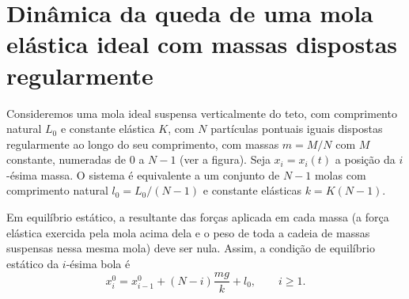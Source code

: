 \documentclass{article}
\begin{document}
\section{Dinâmica da queda de uma mola elástica ideal com massas dispostas
regularmente}
\noindent
\begin{minipage}[t]{0.80\linewidth}
  \hspace{1.2em}
  Consideremos uma mola ideal suspensa verticalmente do teto, com comprimento
  natural $L_0$ e constante elástica $K$, com $N$ partículas pontuais iguais
  dispostas regularmente ao longo do seu comprimento, com massas $m=M/N$ com $M$
  constante, numeradas de 0 a $N-1$ (ver a figura). Seja $x_i=x_i(t)$ a posição
  da $i$-ésima massa. O sistema é equivalente a um conjunto de $N-1$ molas com
  comprimento natural $l_0=L_0/(N-1)$ e constante elásticas $k=K(N-1)$.

  Em equilíbrio estático, a resultante das forças aplicada em cada massa (a
  força elástica exercida pela mola acima dela e o peso de toda a cadeia de
  massas suspensas nessa mesma mola) deve ser nula. Assim, a condição de
  equilíbrio estático da $i$-ésima bola é
  \begin{equation}
    x^0_i = x^0_{i-1} + (N-i)\frac{mg}{k} + l_0, \qquad i\geq1.
  \end{equation}
\end{minipage}\hfill
{}
\end{document}
